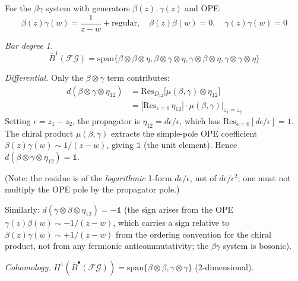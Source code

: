 \begin{example}\label{ex:betagamma-deg1}
For the $\beta\gamma$ system with generators $\beta(z), \gamma(z)$ and OPE:
\[\beta(z)\gamma(w) = \frac{1}{z-w} + \text{regular}, \quad \beta(z)\beta(w) = 0, \quad \gamma(z)\gamma(w) = 0\]

\emph{Bar degree 1.}
\[\bar{B}^1(\mathcal{FG}) = \text{span}\{\beta \otimes \beta \otimes \eta, \beta \otimes \gamma \otimes \eta, \gamma \otimes \beta \otimes \eta, \gamma \otimes \gamma \otimes \eta\}\]

\emph{Differential.} Only the $\beta \otimes \gamma$ term contributes:
\begin{align*}
d(\beta \otimes \gamma \otimes \eta_{12}) &= \text{Res}_{D_{12}}\bigl[\mu(\beta, \gamma) \otimes \eta_{12}\bigr] \\
&= \bigl[\text{Res}_{\epsilon=0}\,\eta_{12}\bigr] \cdot \mu(\beta, \gamma)\big|_{z_1=z_2}
\end{align*}
Setting $\epsilon = z_1 - z_2$, the propagator is $\eta_{12} = d\epsilon/\epsilon$, which has $\text{Res}_{\epsilon=0}[d\epsilon/\epsilon] = 1$. The chiral product $\mu(\beta, \gamma)$ extracts the simple-pole OPE coefficient $\beta(z)\gamma(w) \sim 1/(z-w)$, giving $\mathbb{1}$ (the unit element). Hence $d(\beta \otimes \gamma \otimes \eta_{12}) = \mathbb{1}$.

(Note: the residue is of the \emph{logarithmic} 1-form $d\epsilon/\epsilon$, not of $d\epsilon/\epsilon^2$; one must not multiply the OPE pole by the propagator pole.)

Similarly: $d(\gamma \otimes \beta \otimes \eta_{12}) = -\mathbb{1}$ (the sign arises from the OPE $\gamma(z)\beta(w) \sim -1/(z-w)$, which carries a sign relative to $\beta(z)\gamma(w) \sim +1/(z-w)$ from the ordering convention for the chiral product, not from any fermionic anticommutativity; the $\beta\gamma$ system is bosonic).

\emph{Cohomology.} $H^1(\bar{B}^{\bullet}(\mathcal{FG})) = \text{span}\{\beta \otimes \beta, \gamma \otimes \gamma\}$ (2-dimensional).
\end{example}

